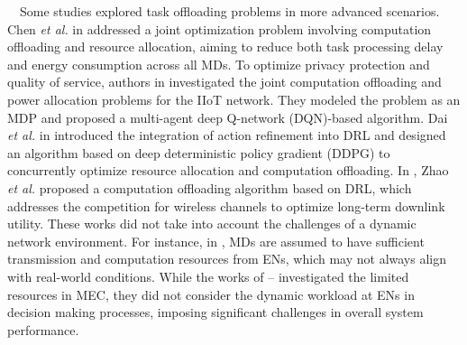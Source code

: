 \documentclass[12pt,draftclsnofoot,onecolumn]{IEEEtran}
\newenvironment{my}[2]%
{\begin{list}{}%
{\setlength{\rightmargin}{#1}\setlength{\leftmargin}{#2}}%


 \item[]{}

} {\end{list}}
\begin{document}
\begin{enumerate}
\begin{my}{1cm}{1cm}
{\,\,\,\, Some studies explored task offloading problems in more advanced scenarios. Chen \textit{et al.} in \cite{chen2021drl} addressed a joint optimization problem involving computation offloading and resource allocation, aiming to reduce both task processing delay and energy consumption across all MDs.
To optimize privacy protection and quality of service, authors in \cite{wu2024privacy} investigated the joint computation offloading and power allocation problems for the IIoT network. They modeled the problem as an MDP and proposed a multi-agent deep Q-network (DQN)-based algorithm.
Dai \textit{et al.} in \cite{dai2020edge} introduced the integration of action refinement into DRL and designed an algorithm based on deep deterministic policy gradient (DDPG) to concurrently optimize resource allocation and computation offloading.
In \cite{zhao2019deep}, Zhao \textit{et al.} proposed a computation offloading algorithm based on DRL, which addresses the competition for wireless channels to optimize long-term downlink utility.
These works did not take into account the challenges of a dynamic network environment. For instance, in \cite{chen2021drl}, MDs are assumed to have sufficient transmission and computation resources from ENs, which may not always align with real-world conditions. While the works of \cite{wu2024privacy}--\cite{zhao2019deep} investigated the limited resources in MEC, they did not consider the dynamic workload at ENs in decision making processes, imposing significant challenges in overall system performance.
}
\end{my}
\end{enumerate}
\end{document}

